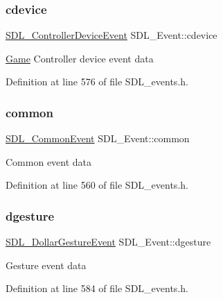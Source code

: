 \mbox{\label{union_s_d_l___event_ad3beed01e690b885728e0b0e1d636378}} 
\subsubsection{\texorpdfstring{cdevice}{cdevice}}
{\footnotesize\ttfamily \mbox{\hyperlink{struct_s_d_l___controller_device_event}{S\+D\+L\+\_\+\+Controller\+Device\+Event}} S\+D\+L\+\_\+\+Event\+::cdevice}

\mbox{\hyperlink{class_game}{Game}} Controller device event data 

Definition at line 576 of file S\+D\+L\+\_\+events.\+h.

\mbox{\label{union_s_d_l___event_abe5cb8767f93de55163c8ddd4562a7f2}} 
\subsubsection{\texorpdfstring{common}{common}}
{\footnotesize\ttfamily \mbox{\hyperlink{struct_s_d_l___common_event}{S\+D\+L\+\_\+\+Common\+Event}} S\+D\+L\+\_\+\+Event\+::common}

Common event data 

Definition at line 560 of file S\+D\+L\+\_\+events.\+h.

\mbox{\label{union_s_d_l___event_a4481167b9f8549aeb254e97ca812e74d}} 
\subsubsection{\texorpdfstring{dgesture}{dgesture}}
{\footnotesize\ttfamily \mbox{\hyperlink{struct_s_d_l___dollar_gesture_event}{S\+D\+L\+\_\+\+Dollar\+Gesture\+Event}} S\+D\+L\+\_\+\+Event\+::dgesture}

Gesture event data 

Definition at line 584 of file S\+D\+L\+\_\+events.\+h.

\mbox{\label{union_s_d_l___event_afe513d46e191a9791988b9adab705ef6}} 
